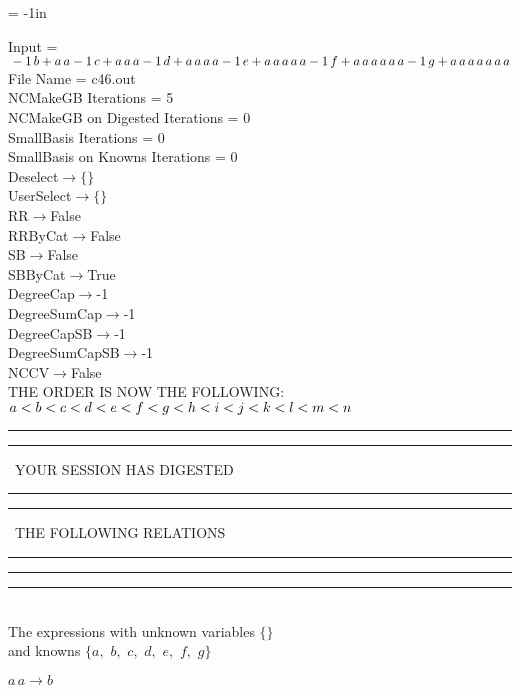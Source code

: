 \voffset = -1in
\evensidemargin 0.1in
\oddsidemargin 0.1in
\textheight 9in
\textwidth 6in

\normalsize
\baselineskip=12pt
\noindent
Input = 
$
\\-1\,
 b + a\,
 a\\
-1\,
 c + a\,
 a\,
 a\\
-1\,
 d + a\,
 a\,
 a\,
 a\\
-1\,
 e + a\,
 a\,
 a\,
 a\,
 a\\
-1\,
 f + a\,
 a\,
 a\,
 a\,
 a\,
 a\\
-1\,
 g + a\,
 a\,
 a\,
 a\,
 a\,
 a\,
 a\\
$
File Name = c46.out\\
NCMakeGB Iterations = 5\\
NCMakeGB on Digested Iterations = 0\\
SmallBasis Iterations = 0\\
SmallBasis on Knowns Iterations = 0\\
Deselect$\rightarrow \{\}$\\
UserSelect$\rightarrow \{\}$\\
RR$\rightarrow $False\\
RRByCat$\rightarrow $False\\
SB$\rightarrow $False\\
SBByCat$\rightarrow $True\\
DegreeCap$\rightarrow $-1\\
DegreeSumCap$\rightarrow $-1\\
DegreeCapSB$\rightarrow $-1\\
DegreeSumCapSB$\rightarrow $-1\\
NCCV$\rightarrow $False\\
THE ORDER IS NOW THE FOLLOWING:\hfil\break
$
a<b<c<d<e<f<g<h<i<j<k<l<m<n\\
$
\rule[2pt]{6in}{4pt}\hfil\break
\rule[2pt]{1.879in}{4pt}
\ YOUR SESSION HAS DIGESTED\ 
\rule[2pt]{1.879in}{4pt}\hfil\break
\rule[2pt]{1.923in}{4pt}
\ THE FOLLOWING RELATIONS\ 
\rule[2pt]{1.923in}{4pt}\hfil\break
\rule[2pt]{6in}{4pt}\hfil\break
\rule[3pt]{6in}{.7pt}\\
The expressions with unknown variables $\{\}$\\
and knowns $\{a,
$ $
b,
$ $
c,
$ $
d,
$ $
e,
$ $
f,
$ $
g\}$\smallskip\\
\begin{minipage}{6in}
$
a\,
 a\rightarrow b
$
\end{minipage}\medskip \\
